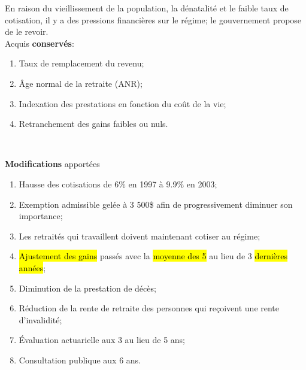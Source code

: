 \documentclass[10pt, french]{article}
\begin{document}
\begin{multicols*}{3}
\begin{rappel_enhanced}[Réforme de 1998]
En raison du vieillissement de la population, la dénatalité et le faible taux de cotisation, il y a des pressions financières sur le régime; le gouvernement propose de le revoir.\\

Acquis \textbf{conservés}:
\begin{enumerate}[leftmargin = *]
	\item	Taux de remplacement du revenu;
	\item	Âge normal de la retraite (ANR);
	\item	Indexation des prestations en fonction du coût de la vie;
	\item	Retranchement des gains faibles ou nuls.
\end{enumerate}

\

\textbf{Modifications} apportées
\begin{enumerate}[leftmargin = *]
	\item	Hausse des cotisations de 6\% en 1997 à 9.9\% en 2003;
	\item	Exemption admissible \hypertarget{seuil_link}{gelée à 3 500\$} afin de progressivement diminuer son importance;
	\item	Les retraités qui travaillent doivent maintenant cotiser au régime;
	\item	\hl{Ajustement des gains} passés avec la \hl{moyenne des 5} au lieu de 3 \hl{dernières années};
	\item	Diminution de la prestation de décès;
	\item	Réduction de la rente de retraite des personnes qui reçoivent une rente d'invalidité;
	\item	Évaluation actuarielle aux 3 au lieu de 5 ans;
	\item	Consultation publique aux 6 ans.
\end{enumerate}
\end{rappel_enhanced}


\end{multicols*}
\end{document}
